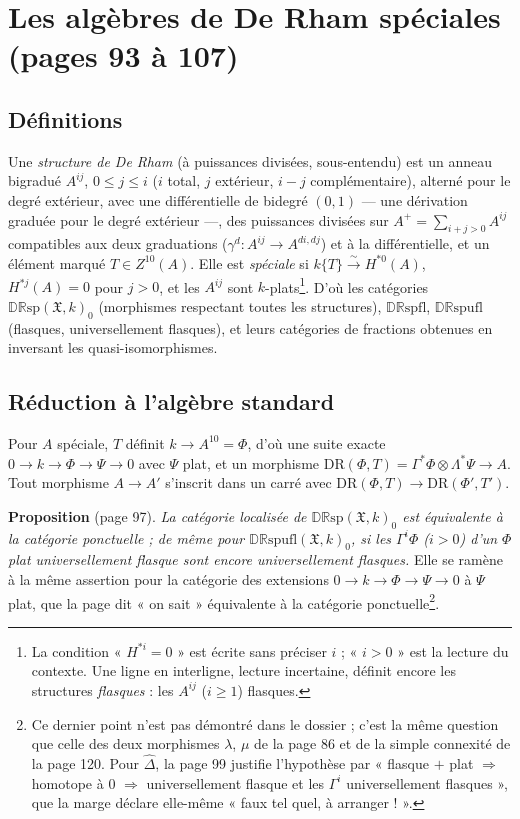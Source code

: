 \documentclass[11pt,a4paper]{article}
\begin{document}
\section*{Les algèbres de De Rham spéciales (pages 93 à 107)}

\subsection*{Définitions}

Une \emph{structure de De Rham} (à puissances divisées, sous-entendu) est un
anneau bigradué $A^{ij}$, $0 \leq j \leq i$ ($i$ total, $j$ extérieur,
$i - j$ complémentaire), alterné pour le degré extérieur, avec une
différentielle de bidegré $(0,1)$ — une dérivation graduée pour le degré
extérieur —, des puissances divisées sur $A^+ = \sum_{i+j>0} A^{ij}$ compatibles
aux deux graduations ($\gamma^d : A^{ij} \to A^{di,dj}$) et à la différentielle,
et un élément marqué $T \in Z^{10}(A)$. Elle est \emph{spéciale} si $k\{T\}
\xrightarrow{\sim} H^{*0}(A)$, $H^{*j}(A) = 0$ pour $j > 0$, et les $A^{ij}$ sont
$k$-plats\footnote{La condition « $H^{*i} = 0$ » est écrite sans préciser $i$ ;
« $i > 0$ » est la lecture du contexte. Une ligne en interligne, lecture
incertaine, définit encore les structures \emph{flasques} : les $A^{ij}$ ($i
\geq 1$) flasques.}. D'où les catégories $\mathbb{DR}\mathrm{sp}(\mathfrak{X},
k)_0$ (morphismes respectant toutes les structures),
$\mathbb{DR}\mathrm{spfl}$, $\mathbb{DR}\mathrm{spufl}$ (flasques,
universellement flasques), et leurs catégories de fractions obtenues en
inversant les quasi-isomorphismes.

\subsection*{Réduction à l'algèbre standard}

Pour $A$ spéciale, $T$ définit $k \to A^{10} = \Phi$, d'où une suite exacte $0
\to k \to \Phi \to \Psi \to 0$ avec $\Psi$ plat, et un morphisme
$\mathrm{DR}(\Phi, T) = \Gamma^*\Phi \otimes \Lambda^*\Psi \to A$. Tout
morphisme $A \to A'$ s'inscrit dans un carré avec $\mathrm{DR}(\Phi,T) \to
\mathrm{DR}(\Phi', T')$.

\textbf{Proposition} (page 97). \emph{La catégorie localisée de
$\mathbb{DR}\mathrm{sp}(\mathfrak{X}, k)_0$ est équivalente à la catégorie
ponctuelle ; de même pour $\mathbb{DR}\mathrm{spufl}(\mathfrak{X},k)_0$, si les
$\Gamma^i\Phi$ ($i > 0$) d'un $\Phi$ plat universellement flasque sont encore
universellement flasques.} Elle se ramène à la même assertion pour la catégorie
des extensions $0 \to k \to \Phi \to \Psi \to 0$ à $\Psi$ plat, que la page dit
« on sait » équivalente à la catégorie ponctuelle\footnote{Ce dernier point
n'est pas démontré dans le dossier ; c'est la même question que celle des deux
morphismes $\lambda$, $\mu$ de la page 86 et de la simple connexité de la page
120. Pour $\widehat{\Delta}$, la page 99 justifie l'hypothèse par
« flasque $+$ plat $\Rightarrow$ homotope à $0$ $\Rightarrow$ universellement
flasque et les $\Gamma^i$ universellement flasques », que la marge déclare
elle-même « faux tel quel, à arranger ! ».}.
\end{document}
